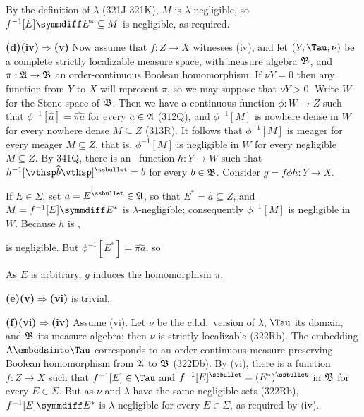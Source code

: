 {By the definition of $\lambda$ (321J-321K), $M$ is
$\lambda$-negligible, so $f^{-1}[E]\symmdiff E^*\subseteq M$ is
negligible, as required.

\medskip

{\bf (d)(iv)$\Rightarrow$(v)} Now assume that $f:Z\to X$ witnesses
(iv), and let $(Y,\Tau,\nu)$ be a complete strictly localizable measure
space, with measure algebra $\frak B$, and $\pi:\frak A\to\frak B$ an
order-continuous Boolean homomorphism.   If $\nu Y=0$ then any function
from $Y$ to $X$ will represent $\pi$, so we may suppose that $\nu Y>0$.
Write $W$ for the Stone space
of $\frak B$.   Then we have a continuous function $\phi:W\to Z$ such
that $\phi^{-1}[\widehat{a}]=\widehat{\pi a}$ for every $a\in\frak A$
(312Q), and
$\phi^{-1}[M]$ is nowhere dense in $W$ for every nowhere dense
$M\subseteq Z$ (313R).   It follows that $\phi^{-1}[M]$ is meager for
every meager $M\subseteq Z$, that is, $\phi^{-1}[M]$ is negligible in
$W$ for every negligible $M\subseteq Z$.   By 341Q, there is an \imp\
function $h:Y\to W$ such that
$h^{-1}[\vthsp\widehat{b}\vthsp]^{\ssbullet}=b$ for
every $b\in\frak B$.   Consider $g=f\phi h:Y\to X$.

If $E\in\Sigma$, set $a=E^{\ssbullet}\in\frak A$, so that
$E^*=\widehat{a}\subseteq Z$, and $M=f^{-1}[E]\symmdiff E^*$ is
$\lambda$-negligible;  consequently $\phi^{-1}[M]$ is negligible in $W$.
Because $h$ is \imp,


\noindent is negligible.   But $\phi^{-1}[E^*]=\widehat{\pi a}$, so

\noindent As $E$ is arbitrary, $g$ induces the homomorphism $\pi$.

\medskip

{\bf (e)(v)$\Rightarrow$(vi)} is trivial.

\medskip

{\bf (f)(vi)$\Rightarrow$(iv)} Assume (vi).   Let $\nu$ be the
c.l.d.\ version of $\lambda$, $\Tau$ its domain, and $\frak B$ its
measure algebra;  then $\nu$ is strictly localizable (322Rb).   The
embedding $\Lambda\embedsinto\Tau$ corresponds to
an order-continuous measure-preserving Boolean homomorphism from
$\frak A$ to $\frak B$ (322Db).
By (vi), there is a function $f:Z\to X$ such that $f^{-1}[E]\in\Tau$ and
$f^{-1}[E]^{\ssbullet}=(E^*)^{\ssbullet}$ in $\frak B$ for
every $E\in\Sigma$.   But as $\nu$ and $\lambda$ have the same
negligible sets (322Rb), $f^{-1}[E]\symmdiff E^*$ is
$\lambda$-negligible for every $E\in\Sigma$, as required by (iv).

}
